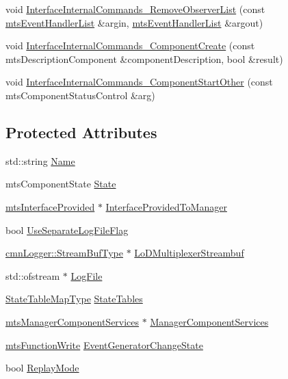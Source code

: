 \begin{DoxyCompactItemize}
\item 
void \hyperlink{classmts_component_a74c3b5c8d362b85ed84f36798aac7207}{Interface\+Internal\+Commands\+\_\+\+Remove\+Observer\+List} (const \hyperlink{classmts_event_handler_list}{mts\+Event\+Handler\+List} \&argin, \hyperlink{classmts_event_handler_list}{mts\+Event\+Handler\+List} \&argout)
\item 
void \hyperlink{classmts_component_a93427d2a73f3d1c2f965837a6eedc46d}{Interface\+Internal\+Commands\+\_\+\+Component\+Create} (const mts\+Description\+Component \&component\+Description, bool \&result)
\item 
void \hyperlink{classmts_component_a1df33090eed7cbc805482227a46fa365}{Interface\+Internal\+Commands\+\_\+\+Component\+Start\+Other} (const mts\+Component\+Status\+Control \&arg)
\end{DoxyCompactItemize}
\subsection*{Protected Attributes}
\begin{DoxyCompactItemize}
\item 
std\+::string \hyperlink{classmts_component_a506cd73bf8afc8286ddf8d933b1b1658}{Name}
\item 
mts\+Component\+State \hyperlink{classmts_component_ac5352257c71985bc22cfa81e87f7f445}{State}
\item 
\hyperlink{classmts_interface_provided}{mts\+Interface\+Provided} $\ast$ \hyperlink{classmts_component_a6f9323d126ef72b6c3803abe4864b759}{Interface\+Provided\+To\+Manager}
\item 
bool \hyperlink{classmts_component_a12390c92b351b911b723158e636a9e5a}{Use\+Separate\+Log\+File\+Flag}
\item 
\hyperlink{classcmn_logger_a7d192777882d1dc6bb48ceac0b4e65bb}{cmn\+Logger\+::\+Stream\+Buf\+Type} $\ast$ \hyperlink{classmts_component_a870d5405720c2b9fc95223a1723712fd}{Lo\+D\+Multiplexer\+Streambuf}
\item 
std\+::ofstream $\ast$ \hyperlink{classmts_component_a5174cc0d7c4802fb479c0d065b79052f}{Log\+File}
\item 
\hyperlink{classmts_component_afd25509fe46d10ebc7a53347aa21c4ec}{State\+Table\+Map\+Type} \hyperlink{classmts_component_abe07b3be754d3f14a8454b21f160b537}{State\+Tables}
\item 
\hyperlink{classmts_manager_component_services}{mts\+Manager\+Component\+Services} $\ast$ \hyperlink{classmts_component_ae405a53b19cda763738c768fc2e6d5b9}{Manager\+Component\+Services}
\item 
\hyperlink{classmts_function_write}{mts\+Function\+Write} \hyperlink{classmts_component_ab7019fec5126701863a90ce46c9617f9}{Event\+Generator\+Change\+State}
\item 
bool \hyperlink{classmts_component_a1415d1093295a997b52d7c9d026fb5cc}{Replay\+Mode}
\end{DoxyCompactItemize}
